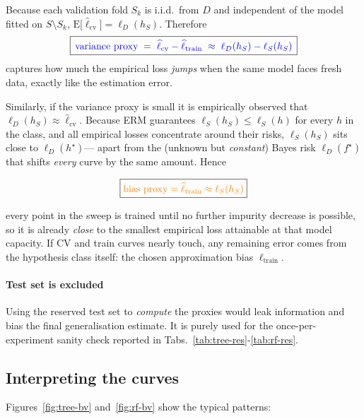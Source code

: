 \documentclass[12pt]{report}
\begin{document}
Because each validation fold $S_k$ is i.i.d.\ from $D$ and independent of the
model fitted on $S\setminus S_k$, $\mathrm{E}\!\bigl[\widehat
\ell_{\text{cv}}\bigr]=\ell_D(h_S)$. Therefore
\[
  \boxed{\,%
  \color{blue}{\text{variance proxy}}
  \;=\;\widehat \ell_{\text{cv}}-\widehat \ell_{\text{train}}
  \;\approx\; \ell_D(h_S)-\ell_S(h_S)
  \,}
\]
captures how much the empirical loss \emph{jumps} when the same model faces
fresh data, exactly like the estimation error.

Similarly, if the variance proxy is small it is empirically observed that
$\ell_D(h_S)\approx\widehat \ell_{\text{cv}}$. Because ERM guarantees
$\ell_S(h_S)\le \ell_S(h)$ for every $h$ in the class, and all empirical losses
concentrate around their risks, $\ell_S(h_S)$ sits close to $\ell_D(h^\star)$—
apart from the (unknown but \emph{constant}) Bayes risk $\ell_D(f^\star)$ that
shifts \emph{every} curve by the same amount. Hence

\[
  \boxed{
  \color{orange}{\text{bias proxy}}
  =\widehat \ell_{\text{train}}
  \approx \ell_S(h_S) 
  }
\]

every point in the sweep is trained until no further impurity decrease is
possible, so it is already \emph{close} to the smallest empirical loss
attainable at that model capacity. If CV and train curves nearly touch, any
remaining error comes from the hypothesis class itself: the chosen
approximation bias $\ell_{\text{train}}$.

\paragraph{Test set is excluded}
Using the reserved test set to \emph{compute} the proxies would leak information
and bias the final generalisation estimate. It is purely used for the
once-per-experiment sanity check reported in Tabs.~\ref{tab:tree-res}-\ref{tab:rf-res}.

\subsection{Interpreting the curves}

Figures~\ref{fig:tree-bv} and~\ref{fig:rf-bv} show the typical patterns:
\end{document}
